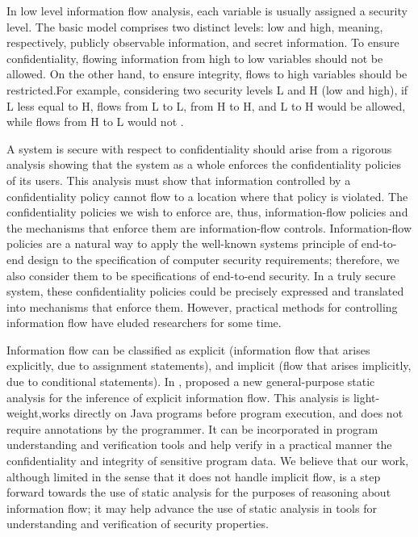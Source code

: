 In low level information flow analysis, each variable is usually assigned a security level. The basic model comprises two distinct levels: low and high, meaning, respectively, publicly observable information, and secret information. To ensure confidentiality, flowing information from high to low variables should not be allowed. On the other hand, to ensure integrity, flows to high variables should be restricted.For example, considering two security levels L and H (low and high), if L less equal to H, flows from L to L, from H to H, and L to H would be allowed, while flows from H to L would not \cite{ref_88_smith2007principles}.

A system is secure with respect to confidentiality
should arise from a rigorous analysis showing that the system
as a whole enforces the confidentiality policies of its users.
This analysis must show that information controlled by a confidentiality policy cannot flow to a location where that policy
is violated. The confidentiality policies we wish to enforce
are, thus, information-flow policies and the mechanisms that
enforce them are information-flow controls. Information-flow
policies are a natural way to apply the well-known systems
principle of end-to-end design \cite{ref_89_saltzer1984end} to the specification of
computer security requirements; therefore, we also consider
them to be specifications of end-to-end security. In a truly
secure system, these confidentiality policies could be precisely
expressed and translated into mechanisms that enforce them.
However, practical methods for controlling information flow
have eluded researchers for some time.

Information flow can be classified as explicit (information flow
that arises explicitly, due to assignment statements), and implicit
(flow that arises implicitly, due to conditional statements). In \cite{ref_90_liu2008static}, proposed a new general-purpose static analysis for the inference
of explicit information flow. This analysis is light-weight,works directly on Java programs before program execution, and
does not require annotations by the programmer. It can be incorporated
in program understanding and verification tools and help
verify in a practical manner the confidentiality and integrity of sensitive program data. We believe that our work, although limited in
the sense that it does not handle implicit flow, is a step forward towards
the use of static analysis for the purposes of reasoning about
information flow; it may help advance the use of static analysis in
tools for understanding and verification of security properties.


